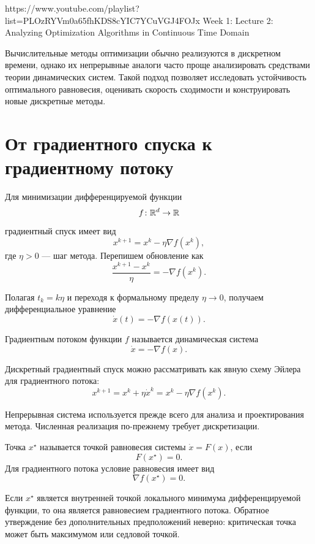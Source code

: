 
\sourcevideo
    {https://www.youtube.com/playlist?list=PLOzRYVm0a65fhKDS8cYIC7YCuVGJ4FOJx}
    {Week 1: Lecture 2: Analyzing Optimization Algorithms
    in Continuous Time Domain}

Вычислительные методы оптимизации обычно реализуются в дискретном
времени, однако их непрерывные аналоги часто проще анализировать
средствами теории динамических систем. Такой подход позволяет
исследовать устойчивость оптимального равновесия, оценивать скорость
сходимости и конструировать новые дискретные методы.

\section{От градиентного спуска к градиентному потоку}

Для минимизации дифференцируемой функции
\[
    f\colon\mathbb{R}^d\to\mathbb{R}
\]
градиентный спуск имеет вид
\[
    x^{k+1}
    =
    x^k-\eta\nabla f(x^k),
\]
где \(\eta>0\) --- шаг метода. Перепишем обновление как
\[
    \frac{x^{k+1}-x^k}{\eta}
    =
    -\nabla f(x^k).
\]

Полагая \(t_k=k\eta\) и переходя к формальному пределу
\(\eta\to0\), получаем дифференциальное уравнение
\[
    \dot{x}(t)
    =
    -\nabla f(x(t)).
\]

\begin{definition}
Градиентным потоком функции \(f\) называется динамическая система
\[
    \dot{x}=-\nabla f(x).
\]
\end{definition}

Дискретный градиентный спуск можно рассматривать как явную схему
Эйлера для градиентного потока:
\[
    x^{k+1}
    =
    x^k+\eta\dot{x}^k
    =
    x^k-\eta\nabla f(x^k).
\]

\begin{remark}
Непрерывная система используется прежде всего для анализа и
проектирования метода. Численная реализация по-прежнему требует
дискретизации.
\end{remark}

\begin{definition}
Точка \(x^\star\) называется точкой равновесия системы
\(\dot{x}=F(x)\), если
\[
    F(x^\star)=0.
\]
Для градиентного потока условие равновесия имеет вид
\[
    \nabla f(x^\star)=0.
\]
\end{definition}

Если \(x^\star\) является внутренней точкой локального минимума
дифференцируемой функции, то она является равновесием градиентного
потока. Обратное утверждение без дополнительных предположений
неверно: критическая точка может быть максимумом или седловой
точкой.


